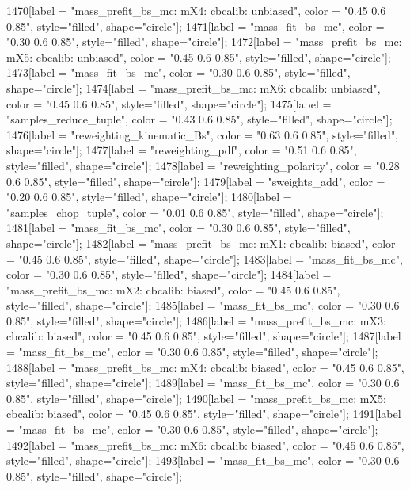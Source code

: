{	1470[label = "mass_prefit_bs_mc\nmassbin: mX4\nmassmodel: cbcalib\ntrigger: unbiased", color = "0.45 0.6 0.85", style="filled", shape="circle"];
	1471[label = "mass_fit_bs_mc", color = "0.30 0.6 0.85", style="filled", shape="circle"];
	1472[label = "mass_prefit_bs_mc\nmassbin: mX5\nmassmodel: cbcalib\ntrigger: unbiased", color = "0.45 0.6 0.85", style="filled", shape="circle"];
	1473[label = "mass_fit_bs_mc", color = "0.30 0.6 0.85", style="filled", shape="circle"];
	1474[label = "mass_prefit_bs_mc\nmassbin: mX6\nmassmodel: cbcalib\ntrigger: unbiased", color = "0.45 0.6 0.85", style="filled", shape="circle"];
	1475[label = "samples_reduce_tuple", color = "0.43 0.6 0.85", style="filled", shape="circle"];
	1476[label = "reweighting_kinematic_Bs", color = "0.63 0.6 0.85", style="filled", shape="circle"];
	1477[label = "reweighting_pdf", color = "0.51 0.6 0.85", style="filled", shape="circle"];
	1478[label = "reweighting_polarity", color = "0.28 0.6 0.85", style="filled", shape="circle"];
	1479[label = "sweights_add", color = "0.20 0.6 0.85", style="filled", shape="circle"];
	1480[label = "samples_chop_tuple", color = "0.01 0.6 0.85", style="filled", shape="circle"];
	1481[label = "mass_fit_bs_mc", color = "0.30 0.6 0.85", style="filled", shape="circle"];
	1482[label = "mass_prefit_bs_mc\nmassbin: mX1\nmassmodel: cbcalib\ntrigger: biased", color = "0.45 0.6 0.85", style="filled", shape="circle"];
	1483[label = "mass_fit_bs_mc", color = "0.30 0.6 0.85", style="filled", shape="circle"];
	1484[label = "mass_prefit_bs_mc\nmassbin: mX2\nmassmodel: cbcalib\ntrigger: biased", color = "0.45 0.6 0.85", style="filled", shape="circle"];
	1485[label = "mass_fit_bs_mc", color = "0.30 0.6 0.85", style="filled", shape="circle"];
	1486[label = "mass_prefit_bs_mc\nmassbin: mX3\nmassmodel: cbcalib\ntrigger: biased", color = "0.45 0.6 0.85", style="filled", shape="circle"];
	1487[label = "mass_fit_bs_mc", color = "0.30 0.6 0.85", style="filled", shape="circle"];
	1488[label = "mass_prefit_bs_mc\nmassbin: mX4\nmassmodel: cbcalib\ntrigger: biased", color = "0.45 0.6 0.85", style="filled", shape="circle"];
	1489[label = "mass_fit_bs_mc", color = "0.30 0.6 0.85", style="filled", shape="circle"];
	1490[label = "mass_prefit_bs_mc\nmassbin: mX5\nmassmodel: cbcalib\ntrigger: biased", color = "0.45 0.6 0.85", style="filled", shape="circle"];
	1491[label = "mass_fit_bs_mc", color = "0.30 0.6 0.85", style="filled", shape="circle"];
	1492[label = "mass_prefit_bs_mc\nmassbin: mX6\nmassmodel: cbcalib\ntrigger: biased", color = "0.45 0.6 0.85", style="filled", shape="circle"];
	1493[label = "mass_fit_bs_mc", color = "0.30 0.6 0.85", style="filled", shape="circle"];
}
